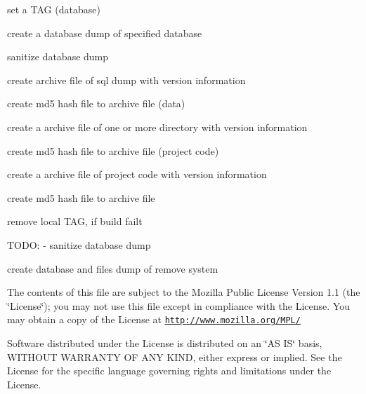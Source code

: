 \begin{DoxyItemize}
\item set a TAG (database)
\item create a database dump of specified database
\item sanitize database dump
\item create archive file of sql dump with version information
\item create md5 hash file to archive file (data)
\item create a archive file of one or more directory with version information
\item create md5 hash file to archive file (project code)
\item create a archive file of project code with version information
\item create md5 hash file to archive file
\item remove local TAG, if build failt
\end{DoxyItemize}

TODO: -\/ sanitize database dump
\begin{DoxyItemize}
\item create database and files dump of remove system
\end{DoxyItemize}

The contents of this file are subject to the Mozilla Public License Version 1.1 (the \char`\"{}License\char`\"{}); you may not use this file except in compliance with the License. You may obtain a copy of the License at \href{http://www.mozilla.org/MPL/}{\tt http://www.mozilla.org/MPL/}

Software distributed under the License is distributed on an \char`\"{}AS IS\char`\"{} basis, WITHOUT WARRANTY OF ANY KIND, either express or implied. See the License for the specific language governing rights and limitations under the License. 

